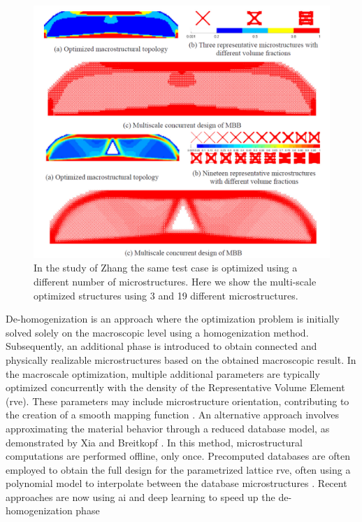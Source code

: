 \begin{figure}
    \centering
    \includegraphics[width=0.9\linewidth]{figures/02_literature/top_multiscale.png}
    \caption{In the study of Zhang \etal \cite{zhang_multiscale_2018} the same test case is optimized using a different number of microstructures. Here we show the multi-scale optimized structures using 3 and 19 different microstructures.}
    \label{fig:02_hierarchical}
\end{figure}

De-homogenization is an approach where the optimization problem is initially solved solely on the macroscopic level using a homogenization method. Subsequently, an additional phase is introduced to obtain connected and physically realizable microstructures based on the obtained macroscopic result. In the macroscale optimization, multiple additional parameters are typically optimized concurrently with the density of the Representative Volume Element (\gls{rve}). These parameters may include microstructure orientation, contributing to the creation of a smooth mapping function . An alternative approach involves approximating the material behavior through a reduced database model, as demonstrated by Xia and Breitkopf . In this method, microstructural computations are performed offline, only once. Precomputed databases are often employed to obtain the full design for the parametrized lattice \gls{rve}, often using a polynomial model to interpolate between the database microstructures . Recent approaches are now using \gls{ai} and deep learning to speed up the de-homogenization phase~ 

